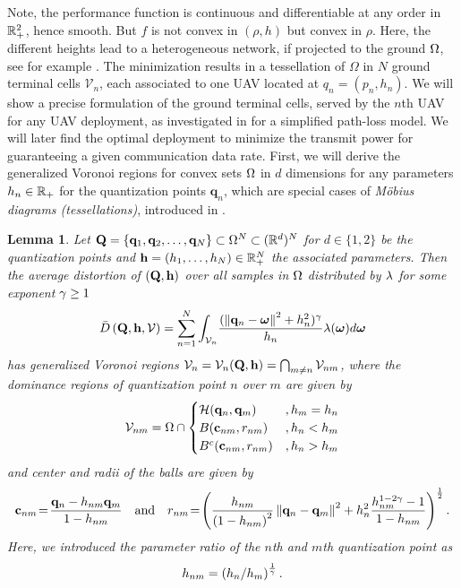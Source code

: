 \documentclass[12pt,onecolumn,journal,draftclsnofoot,letterpaper]{IEEEtran}
\newtheorem{lemma}{Lemma}
\newcounter{example}[section]
\renewcommand{\vp}{\mathbf q}
\renewcommand{\vP}{\mathbf Q}
\newcommand{\HS}{\ensuremath{\mathcal{H}}}          %
\newcommand{\df}{\ensuremath{\lam}}         %
\newcommand{\gP}{\ensuremath{\vP}}          %
\newcommand{\gp}{\ensuremath{\vp}}          %
\newcommand{\fH}{\ensuremath{\vh}}          %
\newcommand{\fh}{\ensuremath{h}}          %
\newcommand{\Vor}{\ensuremath{\mathcal{V}}}         %
\newcommand{\Dis}{\ensuremath{D}}                    %
\newcommand{\AvDis}{\ensuremath{\bar{\Dis}}}         %
\begin{document}
  Note, the performance function is continuous and differentiable at any order in ${\mathbb R}^2_+$, hence smooth. But $f$ is not
  convex in $(\rho,h)$ but convex in $\rho$. 
  Here, the different heights lead to a heterogeneous network, if projected to the ground $\Omega$, see for example
  \cite{GJ16a}.  The minimization results in a tessellation of $\Omega$ in $N$ ground terminal cells $\Vor_n$, each
  associated to one UAV located at $q_n=(p_n,h_n)$.  We will show a precise formulation of the ground terminal cells,
  served by the $n$th UAV for any UAV deployment, as investigated in \cite{MSBD16b} for a simplified path-loss model. We
  will later find the optimal deployment to minimize the transmit power for guaranteeing a given communication data rate.
  \fi
%
First, we will derive the generalized Voronoi regions for convex sets $\Omega$ in $d$ dimensions for any parameters
$h_n\in{\ensuremath{\mathbb R}}_+$  for the quantization points $\vp_n$, which are special cases of \emph{M{\"o}bius diagrams (tessellations)},
introduced in \cite{BWY07}. 
%
\begin{lemma}\label{lem:moebiusdia}
  Let $\vP=\{\gp_1,\gp_2,\dots, \gp_N\}\subset \Omega^N\subset (\R^d)^N$ for $d\in\{1,2\}$ be the quantization points 
  and $\fH=(\fh_1,\dots,\fh_N)\in\R_+^N$  the associated parameters. Then the average distortion of $(\vP,\vh)$ 
  over all samples in $\Omega$ distributed by $\df$ for  some exponent $\gamma\geq1$ 
  \begin{align}
    \AvDis\left(\vP,\fH, \Vor\right) 
    = \sum_{n=1}^{N} \int_{\Vor_n} \! \frac{ (\Norm{\gp_n- \vome}^2 +h_n^2)^{\gam}}{h_n} \df(\vome)d\vome
       \label{eq:minimizationmoebius}
  \end{align}
  has generalized Voronoi regions $\Vor_n= \Vor_{n}(\gP,\fH)= \bigcap_{m\not=n} \Vor_{nm}$, 
  where the dominance regions of quantization point $n$ over $m$ are given by
  \begin{align}
    \Vor_{nm}=\Omega\cap\begin{cases}
         \HS(\gp_n,\gp_m)&, h_m=h_n \\
         B(\vc_{nm},r_{nm}) &, h_n<h_m\\
         B^c(\vc_{nm},r_{nm}) &, h_n>h_m 
        \end{cases}\label{eq:moebius}
  \end{align}
  and center and radii of the balls are given by
  \begin{align}
    \vc_{nm}\!=\!\frac{\gp_n - h_{nm}\gp_m}{1-h_{nm}}
    \quad\text{and}\quad 
    r_{nm}\!=\!\left(\frac{h_{nm}}{\left(1-h_{nm}\right)^2}\Norm{\gp_n-\gp_m}^2  + h_n^2 \frac{h_{nm}^{1-2\gam}
  -1}{1-h_{nm}}\right)^{\frac{1}{2}}.
  \label{eq:rnmcnm}
  \end{align}
  Here, we introduced the parameter ratio of the $n$th and $m$th quantization point as
  \begin{align}
    h_{nm}= \left(h_n/h_m\right)^{\frac{1}{\gamma}}.
  \end{align}
\end{lemma}
\end{document}
